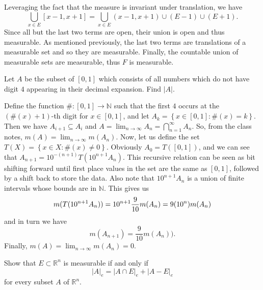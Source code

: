\begin{solution}
  Leveraging the fact that the measure is invariant under translation, we have
  \[
    \bigcup_{x \in E}[x-1,x+1] = \bigcup_{x \in E} (x-1,x+1) \cup (E - 1) \cup (E+1)
  .\] 
  Since all but the last two terms are open, their union is open and thus measurable.
  As mentioned previously, the last two terms are translations of a measurable set and so they are measurable.
  Finally, the countable union of measurable sets are measurable, thus $F$ is measurable.
\end{solution}

\begin{problem}{5}
Let $A$ be the subset of $\left[ 0,1 \right]$ which consists of all numbers which do not have digit $4$ appearing in their decimal expansion.
Find $\left| A \right|$.
\end{problem}

\begin{solution}
  Define the function $\# : [0,1] \to \mathbb{N} $ such that the first $4$ occurs at the $(\#(x)+1)$-th digit for $x \in [0,1]$, and let $A_{k} = \left\{ x\in[0,1] : \#(x) = k \right\}$.
  Then we have $A_{i+1} \subseteq A_{i}$ and $A = \lim_{n \to \infty} A_{n} = \bigcap_{n=1}^{ \infty } A_{n} $.
  So, from the class notes, $m(A) = \lim_{n \to \infty} m(A_{n})$.
  Now, let us define the set $T(X) = \left\{ x \in X : \#(x) \neq  0  \right\}$. 
  Obviously $A_{0} = T([0,1])$, and we can see that $A_{n+1} = 10^{-(n+1)}T(10^{n+1}A_{n})$.
  This recursive relation can be seen as bit shifting forward until first place values in the set are the same as $[0,1]$, followed by a shift back to store the data.
  Also note that $10^{n+1}A_{n}$ is a union of finite intervals whose bounds are in $\mathbb{N}$.
  This gives us
  \[
  m(T(10^{n+1}A_{n})) = 10^{n+1} \frac{9}{10} m(A_{n}) = 9(10^{n})m(A_{n}) \\
  \] 
  and in turn we have
  \[
  m(A_{n+1}) = \frac{9}{10}m(A_{n}))
  .\] 
  Finally, $m(A) = \lim_{n \to \infty} m(A_{n}) = 0$.

\end{solution}

\pagebreak

\begin{problem}{6}
Show that $E \subset \mathbb{R}^{n}$ is measurable if and only if 
\[
\left| A \right|_{e } = \left| A \cap E  \right|_{e} + \left| A - E  \right|_{e}
\] 
for every subset $A$ of $\mathbb{R}^{n}$.
\end{problem}

\begin{solution}
\end{solution}
